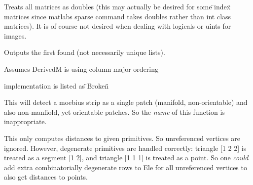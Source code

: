 \begin{DoxyRefList}
%
Treats all matrices as doubles (this may actually be desired for some \"{}index\"{} matrices since matlab\textquotesingle{}s sparse command takes doubles rather than int class matrices). It is of course not desired when dealing with logicals or uint\textquotesingle{}s for images.  
\item[Member \doxylink{classigl_1_1matlab_1_1MatlabWorkspace_a4fe9cb0440cddb78e69dd3fb36632262}{igl\+::matlab\+::Matlab\+Workspace\+::find} (const std\+::string \&name, Eigen\+::\+Plain\+Object\+Base$<$ Derived\+M $>$ \&M)]\label{bug__bug000008}%
%
Outputs the first found (not necessarily unique lists). 
\item[Member \doxylink{classigl_1_1matlab_1_1MatlabWorkspace_a0e8f887139665c6bb6ce1d86736985ea}{igl\+::matlab\+::Matlab\+Workspace\+::save} (const Eigen\+::\+Plain\+Object\+Base$<$ Derived\+M $>$ \&M, const std\+::string \&name)]\label{bug__bug000007}%
%
Assumes DerivedM is using column major ordering  
\item[Member \doxylink{namespaceigl_a2b6d36d1a68f0978c2b20b1586ccc18f}{igl\+::mvc} (const Eigen\+::\+Matrix\+Xd \&V, const Eigen\+::\+Matrix\+Xd \&C, Eigen\+::\+Matrix\+Xd \&W)]\label{bug__bug000009}%
%
implementation is listed as \"{}\+Broken\"{}  
\item[Member \doxylink{namespaceigl_aa7ea97ba9a25206eb1ba9d7469b371d1}{igl\+::orientable\+\_\+patches} (const Eigen\+::\+Matrix\+Base$<$ Derived\+F $>$ \&F, Eigen\+::\+Plain\+Object\+Base$<$ Derived\+C $>$ \&C, Eigen\+::\+Sparse\+Matrix$<$ AScalar $>$ \&A)]\label{bug__bug000010}%
%
This will detect a moebius strip as a single patch (manifold, non-\/orientable) and also non-\/manfiold, yet orientable patches. So the {\itshape name} of this function is inappropriate.  
\item[Member \doxylink{namespaceigl_ae9616bb9fd33e6c00dcb4e8f91952091}{igl\+::point\+\_\+mesh\+\_\+squared\+\_\+distance} (const Eigen\+::\+Matrix\+Base$<$ Derived\+P $>$ \&P, const Eigen\+::\+Matrix\+Base$<$ Derived\+V $>$ \&V, const Eigen\+::\+Matrix\+Base$<$ Derived\+Ele $>$ \&Ele, Eigen\+::\+Plain\+Object\+Base$<$ Derivedsqr\+D $>$ \&sqrD, Eigen\+::\+Plain\+Object\+Base$<$ Derived\+I $>$ \&I, Eigen\+::\+Plain\+Object\+Base$<$ Derived\+C $>$ \&C)]\label{bug__bug000011}%
%
This only computes distances to given primitives. So unreferenced vertices are ignored. However, degenerate primitives are handled correctly\+: triangle \mbox{[}1 2 2\mbox{]} is treated as a segment \mbox{[}1 2\mbox{]}, and triangle \mbox{[}1 1 1\mbox{]} is treated as a point. So one {\itshape could} add extra combinatorially degenerate rows to Ele for all unreferenced vertices to also get distances to points.  

\end{DoxyRefList}
